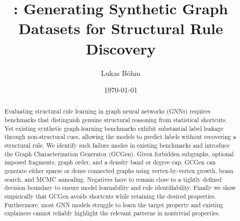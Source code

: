 \documentclass[11pt,twocolumn]{article}
\title{\gen: Generating Synthetic Graph Datasets for Structural Rule Discovery}
\author{Lukas Böhm}
\date{\today}
\newcommand{\gen}{GCGen\xspace}
\begin{document}
\maketitle

\begin{abstract}
Evaluating structural rule learning in graph neural networks (GNNs) requires benchmarks that distinguish genuine structural reasoning from statistical shortcuts.
Yet existing synthetic graph-learning benchmarks exhibit substantial label leakage through non-structural cues, allowing the models to predict labels without recovering a structural rule.
We identify such failure modes in existing benchmarks and introduce the Graph Characterization Generator (\gen).
Given forbidden subgraphs, optional imposed fragments, graph order, and a density band or degree cap, \gen can generate either sparse or dense connected graphs using vertex-by-vertex growth, beam search, and MCMC annealing.
Negatives have to remain close to a tightly defined decision boundary to ensure model learnability and rule identifiability.
Finally we show empirically that \gen avoids shortcuts while retaining the desired properties. Furthermore, most GNN models struggle to learn the target property and existing explainers cannot reliably highlight the relevant patterns in nontrivial properties.
\end{abstract}
\end{document}
